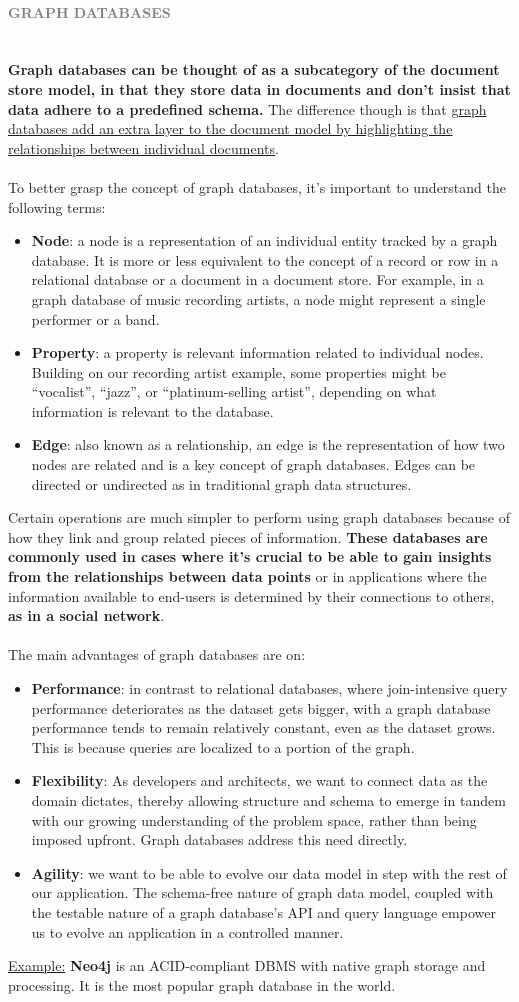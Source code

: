 \documentclass[10pt,a4paper]{article}
\newcommand{\nline}{\\~\\}
\newcommand{\myparagraph}[1]{\paragraph{\normalsize{\textcolor{gray}{\uppercase{\textbf{#1}}}} }\mbox{} \vspace{0.5em}\\}
\begin{document}
\myparagraph{Graph Databases}
\textbf{Graph databases can be thought of as a subcategory of the document store model, in that they store data in documents and don’t insist that data adhere to a predefined schema.} The difference though is that \uline{graph databases add an extra layer to the document model by highlighting the relationships between individual documents}. \nline
To better grasp the concept of graph databases, it’s important to understand the following terms:
\begin{itemize}
	\item \textbf{Node}: a node is a representation of an individual entity tracked by a graph database. It is more or less equivalent to the concept of a record or row in a relational database or a document in a document store. For example, in a graph database of music recording artists, a node might represent a single performer or a band.
	\item \textbf{Property}: a property is relevant information related to individual nodes. Building on our recording artist example, some properties might be “vocalist”, “jazz”, or “platinum-selling artist”, depending on what information is relevant to the database.
	\item \textbf{Edge}: also known as a relationship, an edge is the representation of how two nodes are related and is a key concept of graph databases. Edges can be directed or undirected as in traditional graph data structures.
\end{itemize}
Certain operations are much simpler to perform using graph databases because of how they link and group related pieces of information. \textbf{These databases are commonly used in cases where it’s crucial to be able to gain insights from the relationships between data points} or in applications where the information available to end-users is determined by their connections to others, \textbf{as in a social network}.
\nline
The main advantages of graph databases are on:
\begin{itemize}
	\item \textbf{Performance}: in contrast to relational databases, where join-intensive query performance deteriorates as the dataset gets bigger, with a graph database performance tends to remain relatively constant, even as the dataset grows. This is because queries are localized to a portion of the graph.
	\item \textbf{Flexibility}: As developers and architects, we want to connect data as the domain dictates, thereby allowing structure and schema to emerge in tandem with our growing understanding of the problem space, rather than being imposed upfront. Graph databases address this need directly.
	\item \textbf{Agility}: we want to be able to evolve our data model in step with the rest of our application. The schema-free nature of graph data model, coupled with the testable nature of a graph database’s API and query language empower us to evolve an application in a controlled manner.
\end{itemize}
\uline{Example:} \textbf{Neo4j} is an ACID-compliant DBMS with native graph storage and processing. It is the most popular graph database in the world.
\end{document}
